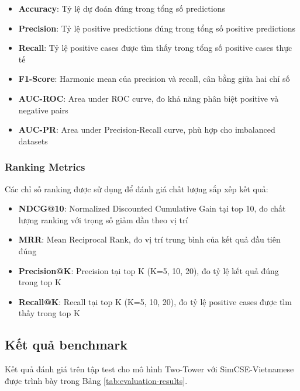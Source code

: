 \begin{itemize}
    \item \textbf{Accuracy}: Tỷ lệ dự đoán đúng trong tổng số predictions
    \item \textbf{Precision}: Tỷ lệ positive predictions đúng trong tổng số positive predictions
    \item \textbf{Recall}: Tỷ lệ positive cases được tìm thấy trong tổng số positive cases thực tế
    \item \textbf{F1-Score}: Harmonic mean của precision và recall, cân bằng giữa hai chỉ số
    \item \textbf{AUC-ROC}: Area under ROC curve, đo khả năng phân biệt positive và negative pairs
    \item \textbf{AUC-PR}: Area under Precision-Recall curve, phù hợp cho imbalanced datasets
\end{itemize}

\subsubsection{Ranking Metrics}

Các chỉ số ranking được sử dụng để đánh giá chất lượng sắp xếp kết quả:

\begin{itemize}
    \item \textbf{NDCG@10}: Normalized Discounted Cumulative Gain tại top 10, đo chất lượng ranking với trọng số giảm dần theo vị trí
    \item \textbf{MRR}: Mean Reciprocal Rank, đo vị trí trung bình của kết quả đầu tiên đúng
    \item \textbf{Precision@K}: Precision tại top K (K=5, 10, 20), đo tỷ lệ kết quả đúng trong top K
    \item \textbf{Recall@K}: Recall tại top K (K=5, 10, 20), đo tỷ lệ positive cases được tìm thấy trong top K
\end{itemize}

\subsection{Kết quả benchmark}

Kết quả đánh giá trên tập test cho mô hình Two-Tower với SimCSE-Vietnamese được trình bày trong Bảng \ref{tab:evaluation-results}.

